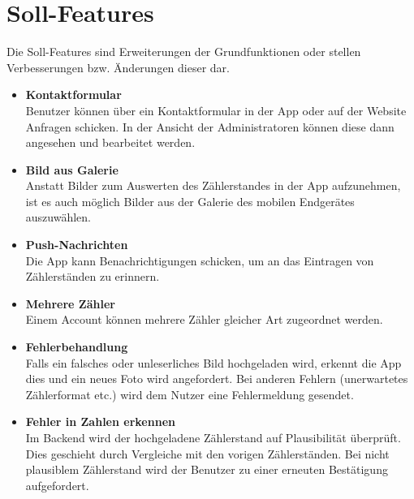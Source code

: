 \section{Soll-Features}
Die Soll-Features sind Erweiterungen der Grundfunktionen oder stellen Verbesserungen bzw. Änderungen dieser dar.
\begin{itemize}
\item \textbf{Kontaktformular} \hfill \\
	Benutzer können über ein Kontaktformular in der App oder auf der Website Anfragen schicken.
	In der Ansicht der Administratoren können diese dann angesehen und bearbeitet werden. 
\item \textbf{Bild aus Galerie} \hfill \\
	Anstatt Bilder zum Auswerten des Zählerstandes in der App aufzunehmen, ist es auch möglich Bilder aus der Galerie des mobilen Endgerätes auszuwählen.
\item \textbf{Push-Nachrichten} \hfill \\
	Die App kann Benachrichtigungen schicken, um an das Eintragen von Zählerständen zu erinnern.
\item \textbf{Mehrere Zähler}\hfill \\
	Einem Account können mehrere Zähler gleicher Art zugeordnet werden.
\item \textbf{Fehlerbehandlung} \hfill \\
	Falls ein falsches oder unleserliches Bild hochgeladen wird, erkennt die App dies und ein neues Foto wird angefordert. 
	Bei anderen Fehlern (unerwartetes Zählerformat etc.) wird dem Nutzer eine Fehlermeldung gesendet.
\item \textbf{Fehler in Zahlen erkennen} \hfill \\
	Im Backend wird der hochgeladene Zählerstand auf Plausibilität überprüft. Dies geschieht durch Vergleiche mit den vorigen Zählerständen. 
	Bei nicht plausiblem Zählerstand wird der Benutzer zu einer erneuten Bestätigung aufgefordert. 
\end{itemize}

